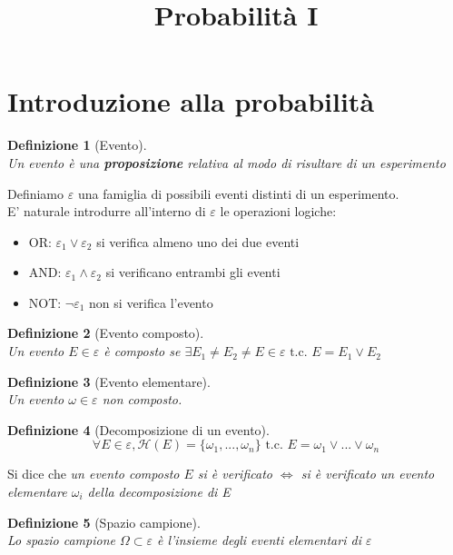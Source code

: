 \documentclass{article}
\newtheorem{definition}{Definizione}[section]
\begin{document}
\title{Probabilità I}
\maketitle
\section{Introduzione alla probabilità}
    \begin{definition}[Evento] \, \\
        Un evento è una \textbf{proposizione} relativa al 
        modo di risultare di un esperimento
    \end{definition}
    Definiamo $\varepsilon$ una famiglia di possibili eventi distinti di un esperimento. \\
    E' naturale introdurre all'interno di $\varepsilon$ le operazioni logiche:
    \begin{itemize}
        \item OR: $\varepsilon_1 \lor \varepsilon_2$ si verifica almeno uno dei due eventi 
        \item AND: $\varepsilon_1 \land \varepsilon_2$ si verificano entrambi gli eventi 
        \item NOT: $\neg \varepsilon_1$ non si verifica l'evento 
    \end{itemize}
    \begin{definition}[Evento composto] \, \\
        Un evento $E \in \varepsilon$ è composto se 
        $\exists E_1 \neq E_2 \neq E \in \varepsilon \textrm{ t.c. } E = E_1 \lor E_2$
    \end{definition} 
    \begin{definition}[Evento elementare] \, \\
        Un evento $\omega \in \varepsilon$ non composto.
    \end{definition}
    \begin{definition}[Decomposizione di un evento]
        $$\forall E \in \varepsilon, \mathcal{H}\left(E\right) = \{\omega_1, ..., \omega_n\} \textrm{ t.c. }
            E = \omega_1 \lor ... \lor \omega_n$$
    \end{definition}
    Si dice che \textit{un evento composto $E$ si è verificato $\iff$ si è verificato
        un evento elementare $\omega_i$ della decomposizione di E}
    \begin{definition}[Spazio campione] \, \\
        Lo spazio campione $\Omega \subset \varepsilon$ è l'insieme degli eventi 
        elementari di $\varepsilon$
    \end{definition}
\end{document}
